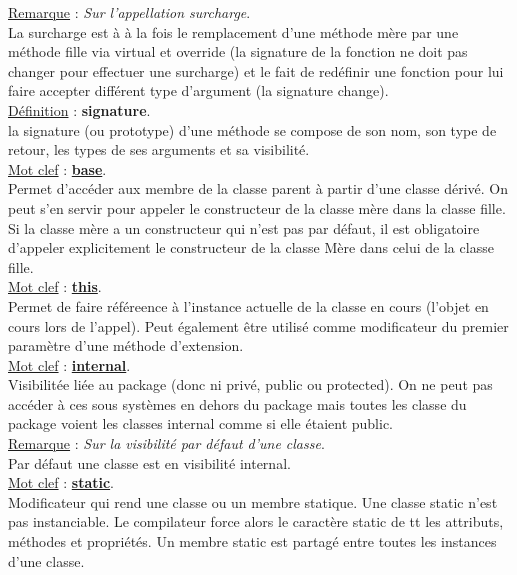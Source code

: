 \documentclass[a4paper,12pt,twoside]{article}
\newcommand{\urlcolor}{magenta}  %
\newcommand{\keycolor}{purple} %
\newcommand{\incode}[1]{{\footnotesize\ttfamily #1}} %
\newcommand{\rem}[2]{\noindent\underline{Remarque} : \textit{#1}.\\ \indent #2}
\newcommand{\defi}[2]{\noindent\underline{Définition} : \textbf{#1}.\\ \indent #2}
\newcommand{\keyref}[2]{\hypersetup{urlcolor=\keycolor} \href{#1}{\textbf{#2}}\hypersetup{urlcolor=\urlcolor}}
\newcommand{\keyword}[3]{\noindent\underline{Mot clef} : \keyref{#1}{#2}. \\ \indent #3}
\begin{document}
\rem{Sur l'appellation surcharge}{La surcharge est à à la fois le remplacement d'une méthode mère par une méthode fille via virtual et override (la signature de la fonction ne doit pas changer pour effectuer une surcharge) et le fait de redéfinir une fonction pour lui faire accepter différent type d'argument (la signature change).}\\

\defi{signature}{la signature (ou prototype) d'une méthode se compose de son nom, son type de retour, les types de ses arguments et sa visibilité.}\\

\keyword{https://docs.microsoft.com/fr-fr/dotnet/csharp/language-reference/keywords/base}{base}{Permet d'accéder aux membre de la classe parent à partir d'une classe dérivé. On peut s'en servir pour appeler le constructeur de la classe mère dans la classe fille. Si la classe mère a un constructeur qui n'est pas par défaut, il est obligatoire d'appeler explicitement le constructeur de la classe Mère dans celui de la classe fille.}\\

\keyword{https://docs.microsoft.com/fr-fr/dotnet/csharp/language-reference/keywords/this}{this}{Permet de faire référeence à l'instance actuelle de la classe en cours (l'objet en cours lors de l'appel). Peut également être utilisé comme modificateur du premier paramètre d’une méthode d’extension.}\\

\keyword{https://docs.microsoft.com/fr-fr/dotnet/csharp/language-reference/keywords/internal}{internal}{Visibilitée liée au package (donc ni privé, public ou protected). On ne peut pas accéder à ces sous systèmes en dehors du package mais toutes les classe du package voient les classes \incode{internal} comme si elle étaient \incode{public}.}\\

\rem{Sur la visibilité par défaut d'une classe}{Par défaut une classe est en visibilité \incode{internal}.}\\

\keyword{https://docs.microsoft.com/fr-fr/dotnet/csharp/language-reference/keywords/static}{static}{Modificateur qui rend une classe ou un membre statique. Une classe \incode{static} n'est pas instanciable. Le compilateur force alors le caractère static de tt les attributs, méthodes et propriétés. Un membre \incode{static} est partagé entre toutes les instances d'une classe.}\\
\end{document}
